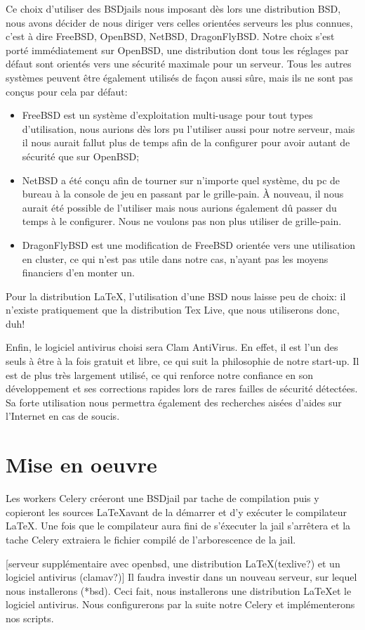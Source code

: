 \documentclass[10pt,a4paper]{article}
\begin{document}
Ce choix d'utiliser des BSDjails nous imposant dès lors une distribution BSD, nous avons décider de nous diriger vers celles orientées serveurs les plus connues,
c'est à dire FreeBSD, OpenBSD, NetBSD, DragonFlyBSD.
Notre choix s'est porté immédiatement sur OpenBSD, une distribution dont tous les réglages par défaut sont orientés vers une sécurité maximale pour un serveur.
Tous les autres systèmes peuvent être également utilisés de façon aussi sûre, mais ils ne sont pas conçus pour cela par défaut:
\begin{itemize}
    \item FreeBSD est un système d'exploitation multi-usage pour tout types d'utilisation, nous aurions dès lors pu l'utiliser aussi pour notre serveur, mais il nous aurait fallut plus de temps afin de la configurer pour avoir autant de sécurité que sur OpenBSD;
    \item NetBSD a été conçu afin de tourner sur n'importe quel système, du pc de bureau à la console de jeu en passant par le grille-pain. À nouveau, il nous aurait été possible de l'utiliser mais nous aurions également dû passer du temps à le configurer. Nous ne voulons pas non plus utiliser de grille-pain.
    \item DragonFlyBSD est une modification de FreeBSD orientée vers une utilisation en cluster, ce qui n'est pas utile dans notre cas, n'ayant pas les moyens financiers d'en monter un.
\end{itemize}

Pour la distribution \LaTeX, l'utilisation d'une BSD nous laisse peu de choix: il n'existe pratiquement que la distribution Tex Live, que nous utiliserons donc, duh! %

Enfin, le logiciel antivirus choisi sera Clam AntiVirus.
En effet, il est l'un des seuls à être à la fois gratuit et libre, ce qui suit la philosophie de notre start-up.
Il est de plus très largement utilisé, ce qui renforce notre confiance en son développement et ses corrections rapides lors de rares failles de sécurité détectées.
Sa forte utilisation nous permettra également des recherches aisées d'aides sur l'Internet en cas de soucis.

\section{Mise en oeuvre}

Les workers Celery créeront une BSDjail par tache de compilation puis y copieront les sources \LaTeX avant de la démarrer et d'y exécuter le compilateur \LaTeX.
Une fois que le compilateur aura fini de s'éxecuter la jail s'arrêtera et la tache Celery extraiera le fichier compilé de l'arborescence de la jail.

[serveur supplémentaire avec openbsd, une distribution \LaTeX (texlive?) et un logiciel antivirus (clamav?)]
Il faudra investir dans un nouveau serveur, sur lequel nous installerons (*bsd).
Ceci fait, nous installerons une distribution \LaTeX et le logiciel antivirus.
Nous configurerons par la suite notre Celery et implémenterons nos scripts.
\end{document}
